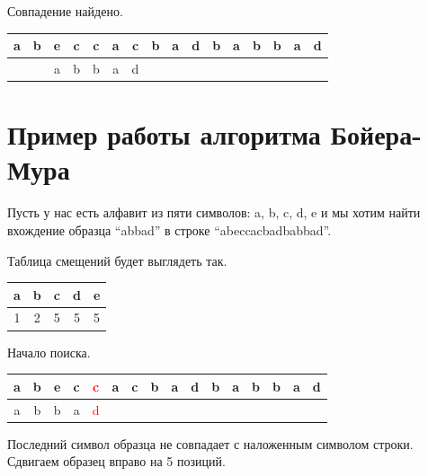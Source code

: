 \documentclass[12pt]{report}
\begin{document}
Совпадение найдено.

\begin{table}[h]
		\begin{tabular}{| c | c | c | c | c | c | c | c | c | c | c | c | c | c | c | c |}
	 	\hline
		a & b & e & c & c & a & c & b & a & d & b & a & b & b & a & d \\ \hline
      &   & a & b & b & a & d & & & & & & & & & \\ \hline
		\end{tabular}
\end{table}


\section{Пример работы алгоритма Бойера-Мура}

Пусть у нас есть алфавит из пяти символов: a, b, c, d, e и мы хотим найти вхождение образца “abbad” в строке “abeccacbadbabbad”.

Таблица смещений будет выглядеть так.

\begin{table}[h!]
		\begin{tabular}{| c | c | c | c | c |}
	 	\hline
		a & b & c & d & e \\ \hline
    1 & 2 & 5 & 5 & 5 \\ \hline
		\end{tabular}
\end{table}

Начало поиска.

\begin{table}[!h]
		\begin{tabular}{| c | c | c | c | c | c | c | c | c | c | c | c | c | c | c | c |}
	 	\hline
		a & b & e & c &  \textcolor{red}{c} & a & c & b & a & d & b & a & b & b & a & d \\ \hline
    a & b & b & a &  \textcolor{red}{d} & & & & & & & & & & & \\ \hline
		\end{tabular}
\end{table}

Последний символ образца не совпадает с наложенным символом строки. Сдвигаем образец вправо на 5 позиций.
\end{document}
